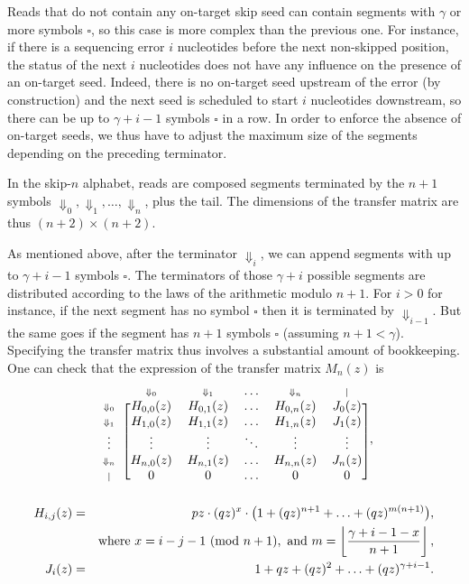 \documentclass{article}
\newcommand{\Dn}[1]{\scriptstyle{\Downarrow_{#1}}}
\newcommand{\nd}{\scriptstyle{|}}
\newcommand{\modulo}[1]{\ (\mathrm{mod}\ #1)}
\begin{document}
Reads that do not contain any on-target skip seed can contain segments
with $\gamma$ or more symbols $\square$, so this case is more complex than
the previous one. For instance, if there is a sequencing error $i$
nucleotides before the next non-skipped position, the status of the next
$i$ nucleotides does not have any influence on the presence of an
on-target seed. Indeed, there is no on-target seed upstream of the error
(by construction) and the next seed is scheduled to start $i$ nucleotides
downstream, so there can be up to $\gamma+i-1$ symbols $\square$ in a row.
In order to enforce the absence of on-target seeds, we thus have to adjust
the maximum size of the segments depending on the preceding terminator.

In the skip-$n$ alphabet, reads are composed segments terminated by the
$n+1$ symbols $\Downarrow_0, \Downarrow_1, \ldots, \Downarrow_n$, plus the
tail. The dimensions of the transfer matrix are thus $(n+2) \times (n+2)$.

As mentioned above, after the terminator $\Downarrow_i$, we can append
segments with up to $\gamma+i-1$ symbols $\square$. The terminators of
those $\gamma+i$ possible segments are distributed according to the laws
of the arithmetic modulo $n+1$. For $i > 0$ for instance, if the next
segment has no symbol $\square$ then it is terminated by
$\Downarrow_{i-1}$. But the same goes if the segment has $n+1$ symbols
$\square$ (assuming $n+1 < \gamma$). Specifying the transfer matrix thus
involves a substantial amount of bookkeeping. One can check that the
expression of the transfer matrix $M_n(z)$ is
\begin{equation*}
\begin{blockarray}{cccccc}
   & \Dn{0} & \Dn{1} & \ldots & \Dn{n} & \nd \\
\begin{block}{c[ccccc]}
\Dn{0} & H_{0,0}(z) & H_{0,1}(z) & \ldots & H_{0,n}(z) & J_0(z) \\
\Dn{1} & H_{1,0}(z) & H_{1,1}(z) & \ldots & H_{1,n}(z) & J_1(z) \\
\vdots & \vdots & \vdots & \ddots & \vdots & \vdots \\
\Dn{n} & H_{n,0}(z) & H_{n,1}(z) & \ldots & H_{n,n}(z) & J_n(z) \\
\nd & 0 & 0 & \ldots & 0 & 0 \\
\end{block}
\end{blockarray},
\end{equation*}
\begin{eqnarray}
H_{i,j}(z) &=& pz \cdot (qz)^x \cdot \big( 1 + (qz)^{n+1} +
  \ldots + (qz)^{m(n+1)} \big), \\
\notag
  &\;& \text{where } x = i-j-1 \modulo{n+1},
  \text{ and } m = \left\lfloor
  \frac{\gamma+i-1-x}{n+1} \right\rfloor, \\
J_i(z) &=& 1 + qz + (qz)^2 + \ldots + (qz)^{\gamma+i-1}.
\end{eqnarray}
\end{document}
